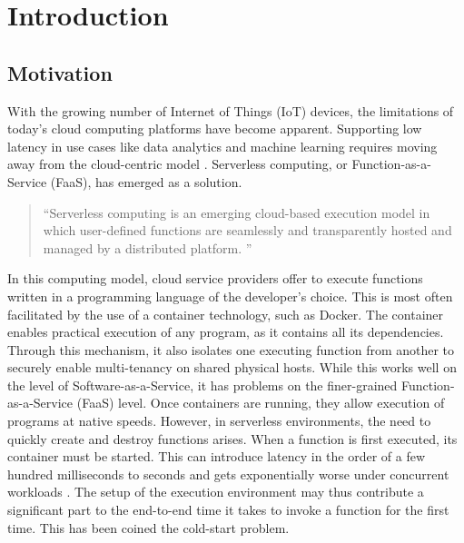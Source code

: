 \chapter{Introduction}
\label{chapter:introduction}



\newcommand{\inl}[1]{\texttt|#1|}

\newcommand{\quot}[1]{\foreignquote{german}{#1}}

\section{Motivation}

With the growing number of Internet of Things (IoT) devices, the limitations of today's cloud computing platforms have become apparent. Supporting low latency in use cases like data analytics and machine learning requires moving away from the cloud-centric model \cite{Nastic2017, Rausch2019}. Serverless computing, or Function-as-a-Service (FaaS), has emerged as a solution.


\begin{quote}
  \quot{Serverless computing is an emerging cloud-based execution model in which user-defined functions are seamlessly and transparently hosted and managed by a distributed platform. \cite{Nastic2017}}
\end{quote}


In this computing model, cloud service providers offer to execute functions written in a programming language of the developer's choice. This is most often facilitated by the use of a container technology, such as Docker. The container enables practical execution of any program, as it contains all its dependencies. Through this mechanism, it also isolates one executing function from another to securely enable multi-tenancy on shared physical hosts. While this works well on the level of Software-as-a-Service, it has problems on the finer-grained Function-as-a-Service (FaaS) level. Once containers are running, they allow execution of programs at native speeds. However, in serverless environments, the need to quickly create and destroy functions arises. When a function is first executed, its container must be started. This can introduce latency in the order of a few hundred milliseconds to seconds \cite{Manner2018, Wang2018} and gets exponentially worse under concurrent workloads \cite{Mohan2019}. The setup of the execution environment may thus contribute a significant part to the end-to-end time it takes to invoke a function for the first time. This has been coined the cold-start problem.

